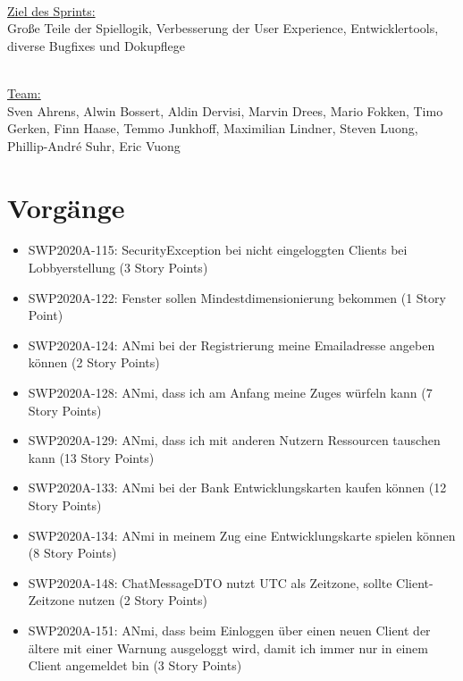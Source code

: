 \documentclass[12pt,a4paper, oneside]{article}
\begin{document}
\noindent 
\\
\underline{Ziel des Sprints:} 
\\
Große Teile der Spiellogik, Verbesserung der User Experience, Entwicklertools, diverse Bugfixes und Dokupflege

\noindent
\\
\underline {Team:} 
\\
Sven Ahrens, Alwin Bossert, Aldin Dervisi, Marvin Drees, Mario Fokken,
Timo Gerken, Finn Haase, Temmo Junkhoff, Maximilian Lindner, Steven Luong, Phillip-André Suhr, Eric Vuong


\section{Vorgänge}

\begin{itemize}

\item SWP2020A-115: SecurityException bei nicht eingeloggten Clients bei Lobbyerstellung (3 Story Points)

\item SWP2020A-122: Fenster sollen Mindestdimensionierung bekommen (1 Story Point)

\item SWP2020A-124: ANmi bei der Registrierung meine Emailadresse angeben können (2 Story Points)

\item SWP2020A-128: ANmi, dass ich am Anfang meine Zuges würfeln kann (7 Story Points)

\item SWP2020A-129: ANmi, dass ich mit anderen Nutzern Ressourcen tauschen kann (13 Story Points)

\item SWP2020A-133: ANmi bei der Bank Entwicklungskarten kaufen können (12 Story Points)

\item SWP2020A-134: ANmi in meinem Zug eine Entwicklungskarte spielen können (8 Story Points)

\item SWP2020A-148: ChatMessageDTO nutzt UTC als Zeitzone, sollte Client-Zeitzone nutzen (2 Story Points)

\item SWP2020A-151: ANmi, dass beim Einloggen über einen neuen Client der ältere mit einer Warnung ausgeloggt wird, damit ich immer nur in einem Client angemeldet bin (3 Story Points)


\end{itemize}
\end{document}
